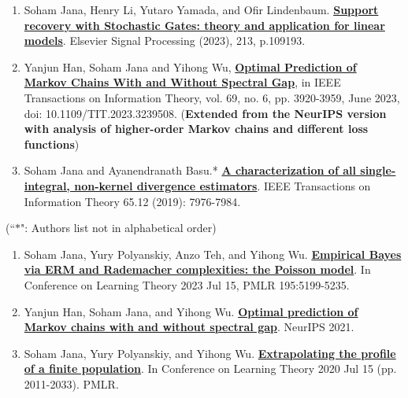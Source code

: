 \documentclass[letterpaper,12pt,oneside]{article}
\theoremstyle{definition}
\begin{document}
			\begin{enumerate}
				\item Soham Jana, Henry Li, Yutaro Yamada, and Ofir Lindenbaum. {\bf \href{https://www.sciencedirect.com/science/article/abs/pii/S0165168423002670}{\bf Support recovery with Stochastic Gates: theory and application for linear models}}. Elsevier Signal Processing (2023), 213, p.109193.
				
				\item Yanjun Han, Soham Jana and Yihong Wu, \href{https://ieeexplore.ieee.org/abstract/document/10028667}{\bf Optimal Prediction of Markov Chains With and Without Spectral Gap}, in IEEE Transactions on Information Theory, vol. 69, no. 6, pp. 3920-3959, June 2023, doi: 10.1109/TIT.2023.3239508. (\textbf{Extended from the NeurIPS version with analysis of higher-order Markov chains and different loss functions})
				
				\item Soham Jana and Ayanendranath Basu.* \href{https://janasoham.github.io/files/bregman_charac.pdf}{\bf A characterization of all single-integral, non-kernel divergence estimators}. IEEE Transactions on Information Theory 65.12 (2019): 7976-7984.
				
			\end{enumerate}
			
			 (``$\ast$": Authors list not in alphabetical order)
			
			\begin{enumerate}
				\item Soham Jana, Yury Polyanskiy, Anzo Teh, and Yihong Wu. \href{https://arxiv.org/abs/2307.02070}{\bf Empirical Bayes via ERM and Rademacher complexities: the Poisson model}. In Conference on Learning Theory 2023 Jul 15, PMLR 195:5199-5235.
				
				\item Yanjun Han, Soham Jana, and Yihong Wu. \href{https://arxiv.org/abs/2106.13947}{\bf Optimal prediction of Markov chains with and without spectral gap}. NeurIPS 2021.
				
				\item Soham Jana, Yury Polyanskiy, and Yihong Wu. \href{https://arxiv.org/abs/2005.10561}{\bf Extrapolating the profile of a finite population}. In Conference on Learning Theory 2020 Jul 15 (pp. 2011-2033). PMLR.
			\end{enumerate}
			
\end{document}
